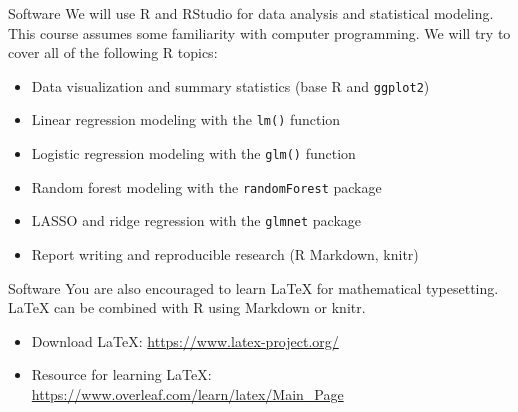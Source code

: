 \documentclass[10pt]{beamer}
\begin{document}
\begin{frame}{Software}
We will use R and RStudio for data analysis and statistical modeling.  This course assumes some familiarity with computer programming.  We will try to cover all of the following R topics:
\begin{itemize}
\item Data visualization and summary statistics (base R and \texttt{ggplot2})
\item Linear regression modeling with the \texttt{lm()} function
\item Logistic regression modeling with the \texttt{glm()} function
\item Random forest modeling with the \texttt{randomForest} package
\item LASSO and ridge regression with the \texttt{glmnet} package
\item Report writing and reproducible research (R Markdown, knitr)
\end{itemize}
\vspace{5pt}
\end{frame}

\begin{frame}{Software}
You are also encouraged to learn LaTeX for mathematical typesetting.  LaTeX can be combined with R using Markdown or knitr.\\
\begin{itemize}
\item Download LaTeX: \url{https://www.latex-project.org/}
\item Resource for learning LaTeX: \url{https://www.overleaf.com/learn/latex/Main_Page}
\end{itemize}
\end{frame}
\end{document}
